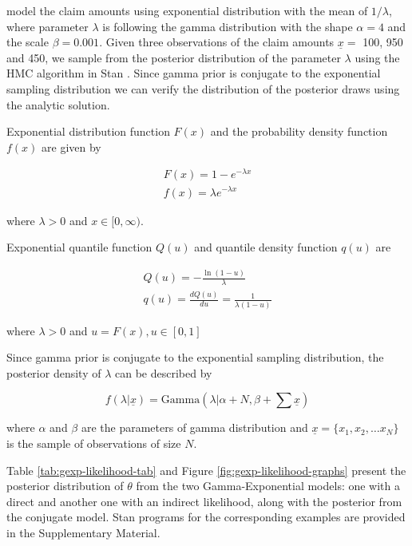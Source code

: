 \documentclass[
  12pt,
]{article}
\begin{document}
\citet{klugman2004LossModelsData} model the claim amounts using exponential distribution with the mean of \(1/\lambda\), where parameter \(\lambda\) is following the gamma distribution with the shape \(\alpha=4\) and the scale \(\beta=0.001\). Given three observations of the claim amounts \(\underline x=\) 100, 950 and 450, we sample from the posterior distribution of the parameter \(\lambda\) using the HMC algorithm in Stan \citep{standevelopmentteam2021RStanInterfaceStan}. Since gamma prior is conjugate to the exponential sampling distribution \citep{pratt1995IntroductionStatisticalDecision} we can verify the distribution of the posterior draws using the analytic solution.

Exponential distribution function \(F(x)\) and the probability density function \(f(x)\) are given by

\[
\begin{gathered}
F(x)=1-e^{-\lambda x} \\ 
f(x)=\lambda e^{-\lambda x}
\end{gathered}
\]

where \(\lambda>0\) and \(x\in[0,\infty)\).

Exponential quantile function \(Q(u)\) and quantile density function \(q(u)\) are

\[
\begin{gathered}
Q(u)=-\frac{\ln(1-u)}{\lambda}\\ 
q(u)=\frac{dQ(u)}{du}=\frac{1}{\lambda(1-u)}
\end{gathered}
\]

where \(\lambda>0\) and \(u=F(x), u \in [0,1]\)

Since gamma prior is conjugate to the exponential sampling distribution, the posterior density of \(\lambda\) can be described by

\[
f(\lambda|\underline{x})=\text{Gamma}(\lambda| \alpha+N, \beta+\sum \underline{x} )
\]

where \(\alpha\) and \(\beta\) are the parameters of gamma distribution and \(\underline{x}=\{x_1, x_2, \dots x_N\}\) is the sample of observations of size \(N\).

Table \ref{tab:gexp-likelihood-tab} and Figure \ref{fig:gexp-likelihood-graphs} present the posterior distribution of \(\theta\) from the two Gamma-Exponential models: one with a direct and another one with an indirect likelihood, along with the posterior from the conjugate model. Stan programs for the corresponding examples are provided in the Supplementary Material.
\end{document}
